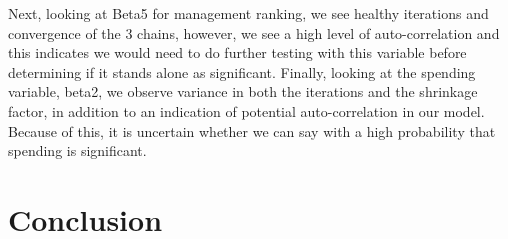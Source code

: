 \documentclass[12pt,english]{article}
\begin{document}
Next, looking at Beta5 for management ranking, we see healthy iterations and convergence of the 3 chains, however, we see a high level of auto-correlation and this indicates we would need to do further testing with this variable before determining if it stands alone as significant. 
Finally, looking at the spending variable, beta2, we observe variance in both the iterations and the shrinkage factor, in addition to an indication of potential auto-correlation in our model. Because of this, it is uncertain whether we can say with a high probability that spending is significant. 



\section{Conclusion}\label{sec:conclusion}
\end{document}
